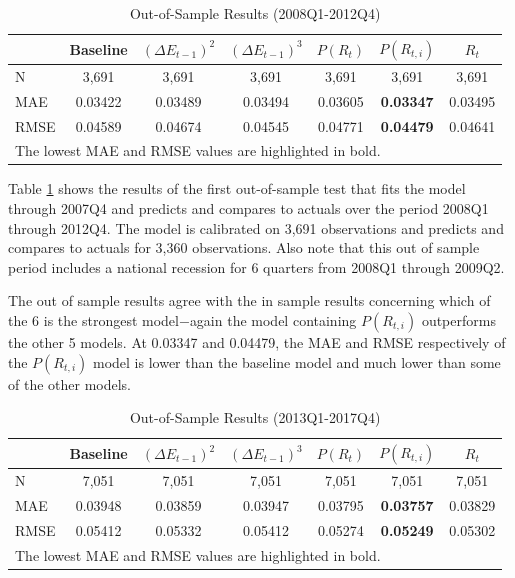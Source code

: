 \documentclass[10pt]{article}
\begin{document}
{
\begin{table}[h]
\caption{Out-of-Sample Results (2008Q1-2012Q4)} \label{reg:os1}
\begin{center}
\begin{tabular}{l c c c c c c}
{} & Baseline & $(\Delta E_{t-1})^2$ & $(\Delta E_{t-1})^3$ & $P(R_t)$ & $P(R_{t,i})$ & $R_t$ \\
\midrule
{N} & 3,691 & 3,691 & 3,691 & 3,691 & 3,691 & 3,691 \\
{MAE} & {0.03422} & 0.03489 & 0.03494 & {0.03605} & \bf{0.03347} & 0.03495 \\
{RMSE} & {0.04589} & 0.04674 & 0.04545 & {0.04771} & \bf{0.04479} & 0.04641 \\
\midrule
\multicolumn{7}{l}{The lowest MAE and RMSE values are highlighted in bold.}
\end{tabular}
\end{center}
\end{table}
}

Table \ref{reg:os1} shows the results of the first out-of-sample test that fits the model through 2007Q4 and predicts and compares to actuals over the period 2008Q1 through 2012Q4.  The model is calibrated on 3,691 observations and predicts and compares to actuals for 3,360 observations.  Also note that this out of sample period includes a national recession for 6 quarters from 2008Q1 through 2009Q2.

The out of sample results agree with the in sample results concerning which of the 6 is the strongest model$-$again the model containing $P(R_{t,i})$ outperforms the other 5 models.  At 0.03347 and 0.04479, the MAE and RMSE respectively of the $P(R_{t,i})$ model is lower than the baseline model and much lower than some of the other models.  

{
\begin{table}[h]
\caption{Out-of-Sample Results (2013Q1-2017Q4)} \label{reg:os2}
\begin{center}
\begin{tabular}{l c c c c c c}
{} & Baseline & $(\Delta E_{t-1})^2$ & $(\Delta E_{t-1})^3$ & $P(R_t)$ & $P(R_{t,i})$ & $R_t$ \\
\midrule
{N} & 7,051 & 7,051 & 7,051 & 7,051 & 7,051 & 7,051 \\
{MAE} & {0.03948} & 0.03859 & 0.03947 & {0.03795} & \bf{0.03757} & 0.03829 \\
{RMSE} & {0.05412} & 0.05332 & {0.05412} & {0.05274} & \bf{0.05249} & 0.05302 \\
\midrule
\multicolumn{7}{l}{The lowest MAE and RMSE values are highlighted in bold.}
\end{tabular}
\end{center}
\end{table}
}
\end{document}

